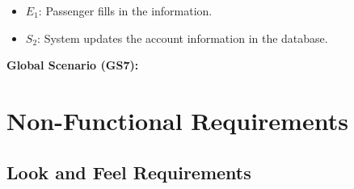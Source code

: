 \documentclass[]{article}
\begin{document}
\begin{enumerate}[{\bf BE1.}]
\begin{enumerate}[{\bf VP1.}]
{{\begin{itemize}
					\item {$E_{1}$:} Passenger fills in the information. 
					\item {$S_{2}$:} System updates the account information in the database.
				\end{itemize}
			}
		}
	\end{enumerate}
	{\bf Global Scenario (GS7):}\\
	\noindent{}
\end{enumerate}


\section{Non-Functional Requirements}
\label{sec:non-functional_requirements}

\subsection{Look and Feel Requirements}
\label{sub:look_and_feel_requirements}
\end{document}
